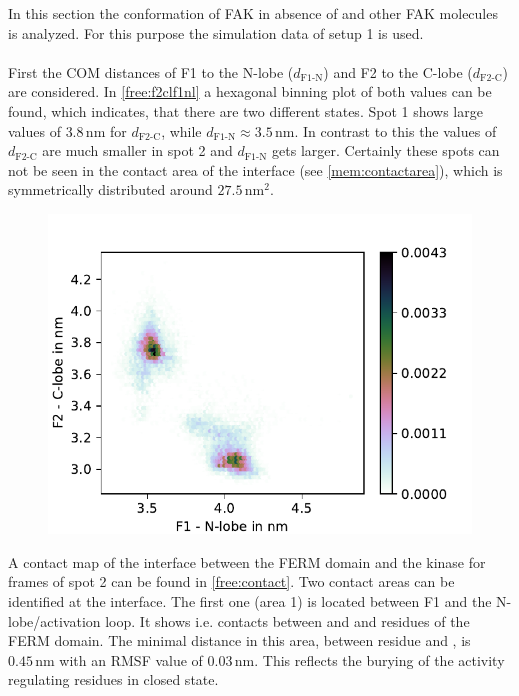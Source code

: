 In this section the conformation of FAK in absence of \pip{} and other FAK molecules is analyzed. For this purpose the simulation data of setup 1 is used.\\
\\
First the COM distances of F1 to the N-lobe ($d_\text{F1-N}$) and F2 to the C-lobe ($d_\text{F2-C}$) are considered. In \autoref{free:f2clf1nl} a hexagonal binning plot of both values can be found, which indicates, that there are two different states. Spot 1 shows large values of $3.8\,\si{\nano\metre}$ for $d_\text{F2-C}$, while $d_\text{F1-N} \approx 3.5\,\si{\nano\metre}$. In contrast to this the values of $d_\text{F2-C}$ are much smaller in spot 2 and $d_\text{F1-N}$ gets larger. Certainly these spots can not be seen in the contact area of the interface (see \autoref{mem:contactarea}), which is symmetrically distributed around $27.5\,\si{\nano\metre}^2$.
%
%
%
\begin{figure}
	\centering
	\includegraphics[width=.7\textwidth]{figures/results/free_f1f2}
	\label{free:f2clf1nl}
\end{figure}
%
%
%
A contact map of the interface between the FERM domain and the kinase for frames of spot 2 can be found in \autoref{free:contact}. Two contact areas can be identified at the interface. The first one (area 1) is located between F1 and the N-lobe/activation loop. It shows i.e. contacts between  and  and residues of the FERM domain. The minimal distance in this area, between residue  and , is $0.45\,\si{\nano\metre}$ with an RMSF value of $0.03\,\si{\nano\metre}$. This reflects the burying of the activity regulating residues in closed state.\\
